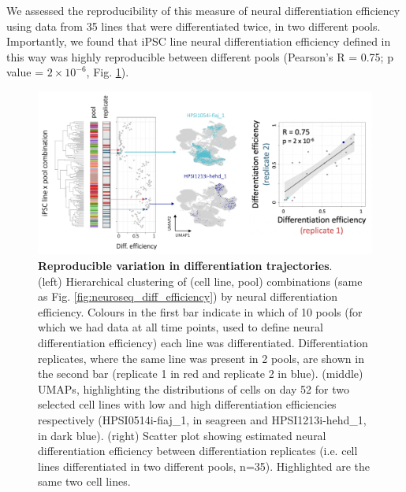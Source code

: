 We assessed the reproducibility of this measure of neural differentiation efficiency using data from 35 lines that were differentiated twice, in two different pools. 
Importantly, we found that iPSC line neural differentiation efficiency defined in this way was highly reproducible between different pools (Pearson's R = 0.75; p value = $2 \times 10^{-6}$, Fig. \ref{fig:neuroseq_diff_eff_replication}).

\begin{figure}[h]
\centering
\includegraphics[width=15.5cm]{Chapter5/Fig/neuroseq_diff_eff_replication.png}
\caption[Reproducible neural differentiation efficiency]{\textbf{Reproducible variation in differentiation trajectories}.\\
(left) Hierarchical clustering of (cell line, pool) combinations (same as Fig. \ref{fig:neuroseq_diff_efficiency}) by neural differentiation efficiency. 
Colours in the first bar indicate in which of 10 pools (for which we had data at all time points, used to define neural differentiation efficiency) each line was differentiated. 
Differentiation replicates, where the same line was present in 2 pools, are shown in the second bar (replicate 1 in red and replicate 2 in blue).
(middle) UMAPs, highlighting the distributions of cells on day 52 for two selected cell lines with low and high differentiation efficiencies respectively (HPSI0514i-fiaj\_1, in seagreen and HPSI1213i-hehd\_1, in dark blue).
(right) Scatter plot showing estimated neural differentiation efficiency between differentiation replicates (i.e. cell lines differentiated in two different pools, n=35). 
Highlighted are the same two cell lines.}
\label{fig:neuroseq_diff_eff_replication}
\end{figure}


